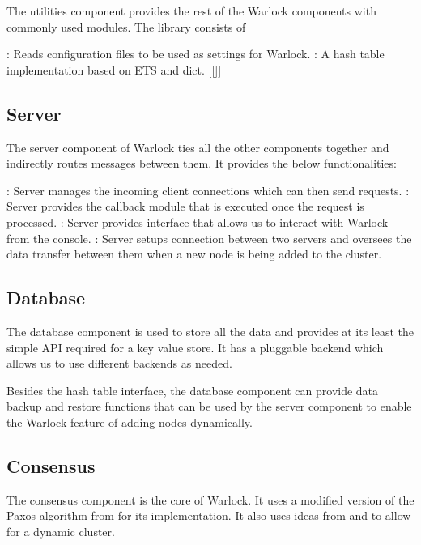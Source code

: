 The utilities component provides the rest of the Warlock components with 
commonly used modules. The library consists of

\begin{itemize}
    : Reads configuration files to be used as 
    settings for Warlock.
    : A hash table implementation based on ETS and dict. [[]]
\end{itemize}

\subsection{Server}

The server component of Warlock ties all the other components together and 
indirectly routes messages between them. It provides the below functionalities:

\begin{itemize}
    : Server manages the incoming client 
    connections which can then send requests.
    : Server provides the callback module that is executed
    once the request is processed.
    : Server provides interface that allows us to interact with
    Warlock from the console.
    : Server setups connection between two servers and 
    oversees the data transfer between them when a new node is being added to
    the cluster.
\end{itemize}

\subsection{Database}

The database component is used to store all the data and provides at its
least the simple API required for a key value store. It has a pluggable backend 
which allows us to use different backends as needed.

Besides the hash table interface, the database component can provide data
backup and restore functions that can be used by the server component to
enable the Warlock feature of adding nodes dynamically.

\subsection{Consensus}

The consensus component is the core of Warlock. It uses a modified version of 
the Paxos algorithm from \citet{Robbert2011} for its implementation. It also
uses ideas from \citet{LamportSP08} and \citet{LamportMZ10} to allow for
a dynamic cluster.

